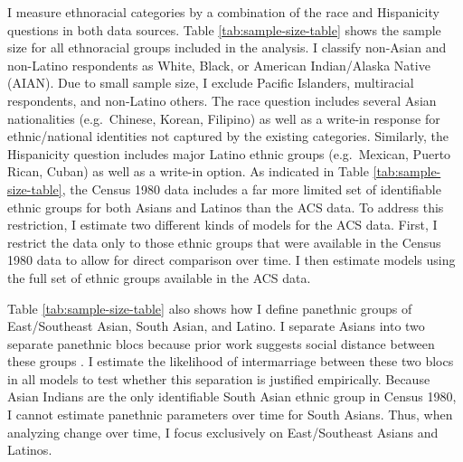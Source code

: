 \documentclass[11pt,]{article}
\begin{document}
I measure ethnoracial categories by a combination of the race and Hispanicity questions in both data sources. Table \ref{tab:sample-size-table} shows the sample size for all ethnoracial groups included in the analysis. I classify non-Asian and non-Latino respondents as White, Black, or American Indian/Alaska Native (AIAN). Due to small sample size, I exclude Pacific Islanders, multiracial respondents, and non-Latino others. The race question includes several Asian nationalities (e.g.~Chinese, Korean, Filipino) as well as a write-in response for ethnic/national identities not captured by the existing categories. Similarly, the Hispanicity question includes major Latino ethnic groups (e.g.~Mexican, Puerto Rican, Cuban) as well as a write-in option. As indicated in Table \ref{tab:sample-size-table}, the Census 1980 data includes a far more limited set of identifiable ethnic groups for both Asians and Latinos than the ACS data. To address this restriction, I estimate two different kinds of models for the ACS data. First, I restrict the data only to those ethnic groups that were available in the Census 1980 data to allow for direct comparison over time. I then estimate models using the full set of ethnic groups available in the ACS data.

Table \ref{tab:sample-size-table} also shows how I define panethnic groups of East/Southeast Asian, South Asian, and Latino. I separate Asians into two separate panethnic blocs because prior work suggests social distance between these groups \citep{kibria_not_1996, morning_racial_2001, schachter_finding_2014}. I estimate the likelihood of intermarriage between these two blocs in all models to test whether this separation is justified empirically. Because Asian Indians are the only identifiable South Asian ethnic group in Census 1980, I cannot estimate panethnic parameters over time for South Asians. Thus, when analyzing change over time, I focus exclusively on East/Southeast Asians and Latinos.
\end{document}
